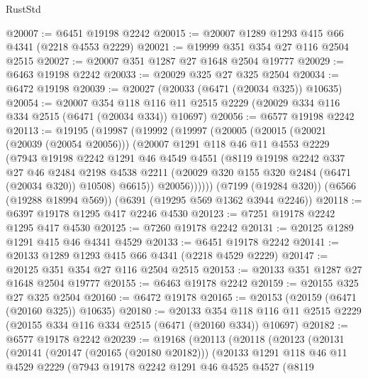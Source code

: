 \begin{lexlean}{RustStd}
\begin{coremodule}
@20007 := @6451 @19198 @2242
@20015 := @20007 @1289 @1293 @415 @66 @4341 (@2218 @4553 @2229)
@20021 := @19999 @351 @354 @27 @116 @2504 @2515
@20027 := @20007 @351 @1287 @27 @1648 @2504 @19777
@20029 := @6463 @19198 @2242
@20033 := @20029 @325 @27 @325 @2504
@20034 := @6472 @19198
@20039 := @20027 (@20033 (@6471 (@20034 @325)) @10635)
@20054 := @20007
    @354
    @118
    @116
    @11
    @2515
    @2229
    (@20029 @334 @116 @334 @2515 (@6471 (@20034 @334)) @10697)
@20056 := @6577 @19198 @2242
@20113 := @19195
    (@19987
      (@19992
        (@19997
          (@20005
            (@20015
              (@20021 (@20039 (@20054 @20056)))
              (@20007
                @1291
                @118
                @46
                @11
                @4553
                @2229
                (@7943
                  @19198
                  @2242
                  @1291
                  @46
                  @4549
                  @4551
                  (@8119
                    @19198
                    @2242
                    @337
                    @27
                    @46
                    @2484
                    @2198
                    @4538
                    @2211
                    (@20029 @320 @155 @320 @2484 (@6471 (@20034 @320)) @10508)
                    @6615))
                @20056))))))
    (@7199 (@19284 @320))
    (@6566 (@19288 @18994 @569))
    (@6391 (@19295 @569 @1362 @3944 @2246))
@20118 := @6397 @19178 @1295 @417 @2246 @4530
@20123 := @7251 @19178 @2242 @1295 @417 @4530
@20125 := @7260 @19178 @2242
@20131 := @20125 @1289 @1291 @415 @46 @4341 @4529
@20133 := @6451 @19178 @2242
@20141 := @20133 @1289 @1293 @415 @66 @4341 (@2218 @4529 @2229)
@20147 := @20125 @351 @354 @27 @116 @2504 @2515
@20153 := @20133 @351 @1287 @27 @1648 @2504 @19777
@20155 := @6463 @19178 @2242
@20159 := @20155 @325 @27 @325 @2504
@20160 := @6472 @19178
@20165 := @20153 (@20159 (@6471 (@20160 @325)) @10635)
@20180 := @20133
    @354
    @118
    @116
    @11
    @2515
    @2229
    (@20155 @334 @116 @334 @2515 (@6471 (@20160 @334)) @10697)
@20182 := @6577 @19178 @2242
@20239 := @19168
    (@20113
      (@20118
        (@20123
          (@20131
            (@20141
              (@20147 (@20165 (@20180 @20182)))
              (@20133
                @1291
                @118
                @46
                @11
                @4529
                @2229
                (@7943
                  @19178
                  @2242
                  @1291
                  @46
                  @4525
                  @4527
                  (@8119

\end{coremodule}
\end{lexlean}

